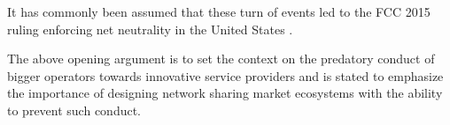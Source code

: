 It has commonly been assumed that these turn of events led to the \ac{FCC} 2015 ruling enforcing net neutrality in the United States \cite{lindeberg2019coordinating}. 

The above opening argument is to set the context on the predatory conduct of bigger operators towards innovative service providers and is stated to emphasize the importance of designing network sharing market ecosystems with the ability to prevent such conduct.






            
        
